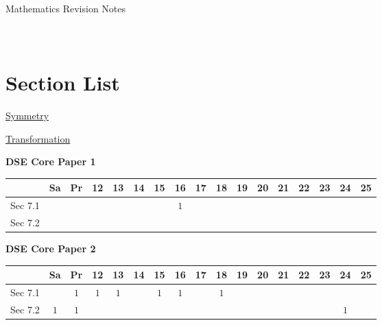 \documentclass[12pt, a4paper]{article}
\begin{document}
\newpage
\newpage
\thispagestyle{empty}
\begin{center}
Mathematics Revision Notes\\\vspace{1cm}
\\\vspace{1cm}
{\fontsize{24pt}{24pt}\selectfont {Symmetry and Transformation}} \\\vspace{1cm}
\label{chapter:S1-7}

\end{center}
\vspace{0.5cm}
\hline
\section*{Section List}
\begin{enumx}[label=Sec 7.\arabic*\ ]
\item \hyperref[section:1-7-1]{Symmetry}
\item \hyperref[section:1-7-2]{Transformation}
\end{enumx}
\begin{absolutelynopagebreak}
\begin{center}
\textbf{DSE Core Paper 1}
\end{center}
\begin{center}
\begin{tabular}{|l|c|c|c|c|c|c|c|c|c|c|c|c|c|c|c|c|}
\hline
        & Sa & Pr & 12 & 13 & 14 & 15 & 16 & 17 & 18 & 19 & 20 & 21 & 22 & 23 & 24 & 25 \\\hline\hline
Sec 7.1 &  &  &  &  &  &  &  $1$ &  &  &  &  &  &  &  &  &  \\\hline
Sec 7.2 &  &  &  &  &  &  &  &  &  &  &  &  &  &  &  &  \\\hline
\end{tabular}
\end{center}
\end{absolutelynopagebreak}
\begin{absolutelynopagebreak}
\begin{center}
\textbf{DSE Core Paper 2}
\end{center}
\begin{center}
\begin{tabular}{|l|c|c|c|c|c|c|c|c|c|c|c|c|c|c|c|c|}
\hline
        & Sa & Pr & 12 & 13 & 14 & 15 & 16 & 17 & 18 & 19 & 20 & 21 & 22 & 23 & 24 & 25 \\\hline\hline
Sec 7.1 &  &  $1$ &  $1$ &  $1$ &  &  $1$ &  $1$ &  &  $1$ &  &  &  &  &  &  &  \\\hline
Sec 7.2 &  $1$ &  $1$ &  &  &  &  &  &  &  &  &  &  &  &  &  $1$ &  \\\hline
\end{tabular}
\end{center}
\end{absolutelynopagebreak}
\end{document}

